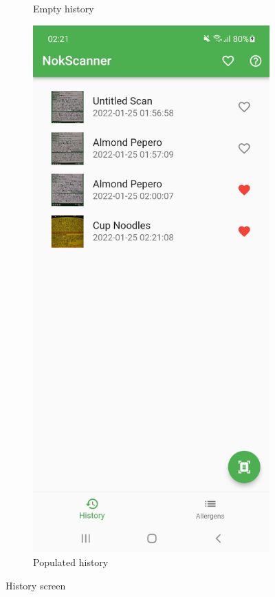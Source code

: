 \begin{figure}[h]
\begin{subfigure}{0.5\textwidth}
        \caption{Empty history}
        \label{fig:history-empty}
    \end{subfigure}
    \begin{subfigure}{0.5\textwidth}
        \centering
        \includegraphics[width=0.9\linewidth]{Figures/Screenshot/history.jpg}
        \caption{Populated history}
        \label{fig:history}
    \end{subfigure}
    \caption{History screen}
    \label{fig:history2}
\end{figure}

